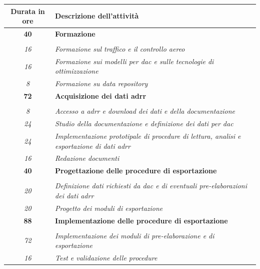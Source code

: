 \begin{table}[htbp]
\begin{tabularx}{\textwidth}{!{\vrule}c!{\vrule}X!{\vrule}}
	\hline
	\textbf{Durata in ore} & \textbf{Descrizione dell'attività} \\\hline
	
	\textbf{40} & \textbf{Formazione} \\ \hdashline 
    \\ 
    \textit{16} & 
    \textit{Formazione sul traffico e il controllo aereo} \\
    \textit{16} & 
    \textit{Formazione sui modelli per \gls{dac} e sulle tecnologie di ottimizzazione} \\
    \textit{8} & 
    \textit{Formazione su data repository \citet{eurocontrol2025}} \\
    \hline
    
    \textbf{72} & \textbf{Acquisizione dei dati \gls{adrr}}  \\ \hdashline 
    \\ 
    \textit{8} & 
    \textit{Accesso a \gls{adrr} e download dei dati e della documentazione} \\
    \textit{24} & 
    \textit{Studio della documentazione e definizione dei dati per \gls{dac}} \\
    \textit{24} & 
    \textit{Implementazione prototipale di procedure di lettura, analisi e esportazione di dati \gls{adrr}} \\
    \textit{16} & 
    \textit{Redazione documenti} \\
    \hline

    \textbf{40} & \textbf{Progettazione delle procedure di esportazione}  \\ \hdashline 
    \\ 
    \textit{20} & 
    \textit{Definizione dati richiesti da \gls{dac} e di eventuali pre-elaborazioni dei dati \gls{adrr}} \\
    \textit{20} & 
    \textit{Progetto dei moduli di esportazione} \\
    \hline
 
    \textbf{88} & \textbf{Implementazione delle procedure di esportazione}  \\ \hdashline 
    \\ 
    \textit{72} & 
    \textit{Implementazione dei moduli di pre-elaborazione e di esportazione} \\
    \textit{16} & 
    \textit{Test e validazione delle procedure} \\
    \hline   


\end{tabularx}
\end{table}
